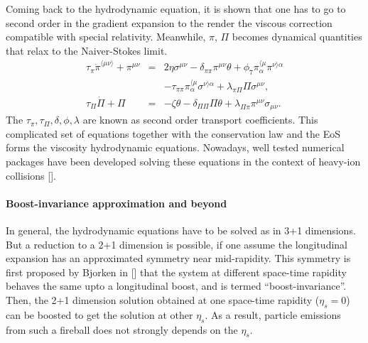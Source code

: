 Coming back to the hydrodynamic equation, it is shown that one has to go to second order in the gradient expansion to the render the viscous correction compatible with special relativity.
Meanwhile, $\pi$, $\Pi$ becomes dynamical quantities that relax to the Naiver-Stokes limit.
\begin{eqnarray}
\tau_\pi \dot{\pi}^{\langle\mu\nu\rangle}+\pi^{\mu\nu} &=& 2\eta\sigma^{\mu\nu}- \delta_{\pi\pi}\pi^{\mu\nu}\theta + \phi_7 \pi_{\alpha}^{\langle\mu}\pi^{\nu\rangle\alpha}\\ 
\nonumber
&& -\tau_{\pi\pi}\pi_{\alpha}^{\langle\mu}\sigma^{\nu\rangle\alpha} + \lambda_{\pi\Pi}\Pi\sigma^{\mu\nu},
\\
\tau_{\Pi}\dot{\Pi} + \Pi &=& -\zeta\theta - \delta_{\Pi\Pi}\Pi\theta + \lambda_{\Pi\pi}\pi^{\mu\nu}\sigma_{\mu\nu}.
\end{eqnarray}
The $\tau_\pi, \tau_\Pi, \delta, \phi, \lambda$ are known as second order transport coefficients.
This complicated set of equations together with the conservation law and the EoS forms the viscosity hydrodynamic equations.
Nowadays, well tested numerical packages have been developed solving these equations in the context of heavy-ion collisions [].

\paragraph{Boost-invariance approximation and beyond}
In general, the hydrodynamic equations have to be solved as in 3+1 dimensions.
But a reduction to a 2+1 dimension is possible, if one assume the longitudinal expansion has an approximated symmetry near mid-rapidity.
This symmetry is first proposed by Bjorken in [] that the system at different space-time rapidity behaves the same upto a longitudinal boost, and is termed ``boost-invariance''.
 Then, the 2+1 dimension solution obtained at one space-time rapidity ($\eta_s = 0$) can be boosted to get the solution at other $\eta_s$.
As a result, particle emissions from such a fireball does not strongly depends on the $\eta_s$.

